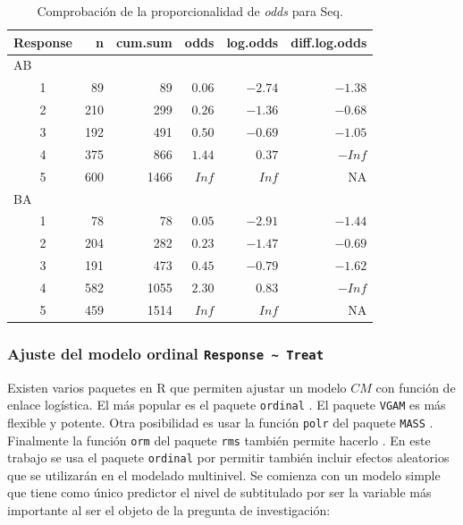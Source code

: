 \documentclass[
  12pt,
  a4paper,
  extrafontsizes,
  onecolumn,
  openright,
  table]{memoir}
\begin{document}
\hypertarget{tbl-po.check}{}
\begin{longtable}{crrrrr}
\caption{\label{tbl-po.check}Comprobación de la proporcionalidad de \emph{odds} para Seq. }\tabularnewline

\toprule
Response & n & cum.sum & odds & log.odds & diff.log.odds \\ 
\midrule
\multicolumn{6}{l}{AB} \\ 
\midrule
1 & 89 & 89 & $0.06$ & $-2.74$ & $-1.38$ \\ 
2 & 210 & 299 & $0.26$ & $-1.36$ & $-0.68$ \\ 
3 & 192 & 491 & $0.50$ & $-0.69$ & $-1.05$ \\ 
4 & 375 & 866 & $1.44$ & $0.37$ & $-Inf$ \\ 
5 & 600 & 1466 & $Inf$ & $Inf$ & NA \\ 
\midrule
\multicolumn{6}{l}{BA} \\ 
\midrule
1 & 78 & 78 & $0.05$ & $-2.91$ & $-1.44$ \\ 
2 & 204 & 282 & $0.23$ & $-1.47$ & $-0.69$ \\ 
3 & 191 & 473 & $0.45$ & $-0.79$ & $-1.62$ \\ 
4 & 582 & 1055 & $2.30$ & $0.83$ & $-Inf$ \\ 
5 & 459 & 1514 & $Inf$ & $Inf$ & NA \\ 
\bottomrule
\end{longtable}

\hypertarget{ajuste-del-modelo-ordinal-response-treat}{%
\subsubsection{\texorpdfstring{Ajuste del modelo ordinal
\texttt{Response\ \textasciitilde{}\ Treat}}{Ajuste del modelo ordinal Response \textasciitilde{} Treat}}\label{ajuste-del-modelo-ordinal-response-treat}}

Existen varios paquetes en R que permiten ajustar un modelo \(CM\) con
función de enlace logística. El más popular es el paquete
\texttt{ordinal} \autocite[ver][]{ordinalR}. El paquete \texttt{VGAM}
\autocite[ver][]{VGAMR} es más flexible y potente. Otra posibilidad es
usar la función \texttt{polr} del paquete \texttt{MASS}
\autocite[ver][]{MASSR}. Finalmente la función \texttt{orm} del paquete
\texttt{rms} también permite hacerlo \autocite[ver][]{harrell2015}. En
este trabajo se usa el paquete \texttt{ordinal}
\autocite[ver][]{ordinal} por permitir también incluir efectos
aleatorios que se utilizarán en el modelado multinivel. Se comienza con
un modelo simple que tiene como único predictor el nivel de subtitulado
por ser la variable más importante al ser el objeto de la pregunta de
investigación:
\end{document}
